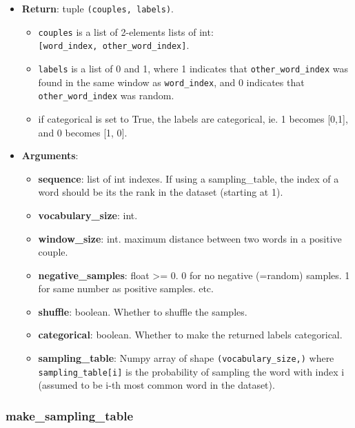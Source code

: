 \begin{itemize}
\tightlist
\item
  \textbf{Return}: tuple \texttt{(couples,\ labels)}.

  \begin{itemize}
  \tightlist
  \item
    \texttt{couples} is a list of 2-elements lists of int:
    \texttt{{[}word\_index,\ other\_word\_index{]}}.
  \item
    \texttt{labels} is a list of 0 and 1, where 1 indicates that
    \texttt{other\_word\_index} was found in the same window as
    \texttt{word\_index}, and 0 indicates that
    \texttt{other\_word\_index} was random.
  \item
    if categorical is set to True, the labels are categorical, ie. 1
    becomes {[}0,1{]}, and 0 becomes {[}1, 0{]}.
  \end{itemize}
\item
  \textbf{Arguments}:

  \begin{itemize}
  \tightlist
  \item
    \textbf{sequence}: list of int indexes. If using a sampling\_table,
    the index of a word should be its the rank in the dataset (starting
    at 1).
  \item
    \textbf{vocabulary\_size}: int.
  \item
    \textbf{window\_size}: int. maximum distance between two words in a
    positive couple.
  \item
    \textbf{negative\_samples}: float \textgreater{}= 0. 0 for no
    negative (=random) samples. 1 for same number as positive samples.
    etc.
  \item
    \textbf{shuffle}: boolean. Whether to shuffle the samples.
  \item
    \textbf{categorical}: boolean. Whether to make the returned labels
    categorical.
  \item
    \textbf{sampling\_table}: Numpy array of shape
    \texttt{(vocabulary\_size,)} where \texttt{sampling\_table{[}i{]}}
    is the probability of sampling the word with index i (assumed to be
    i-th most common word in the dataset).
  \end{itemize}
\end{itemize}


\subsubsection{make\_sampling\_table}\label{makeux5fsamplingux5ftable}

